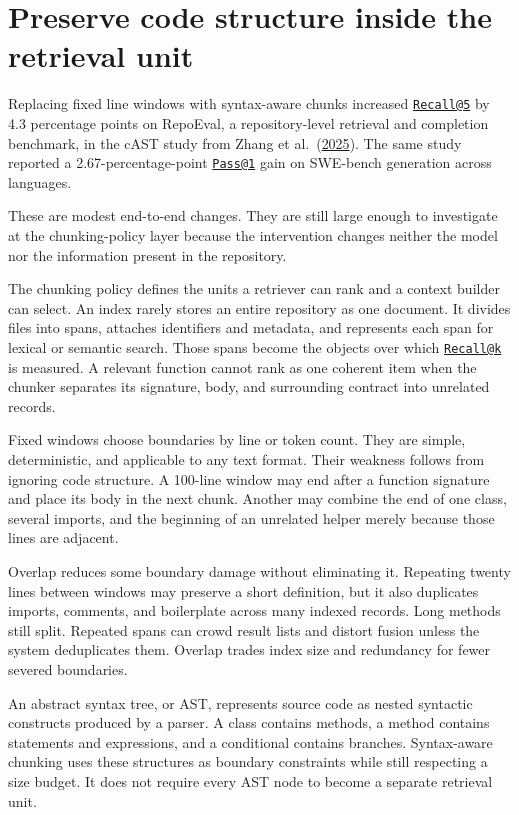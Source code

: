 \section{Preserve code structure inside the retrieval unit}\label{preserve-code-structure-inside-the-retrieval-unit}

Replacing fixed line windows with syntax-aware chunks increased \href{mailto:Recall@5}{\nolinkurl{Recall@5}} by 4.3 percentage points on RepoEval, a repository-level retrieval and completion benchmark, in the cAST study from Zhang et al.~(\href{https://arxiv.org/abs/2506.15655}{2025}). The same study reported a 2.67-percentage-point \href{mailto:Pass@1}{\nolinkurl{Pass@1}} gain on SWE-bench generation across languages.

These are modest end-to-end changes. They are still large enough to investigate at the chunking-policy layer because the intervention changes neither the model nor the information present in the repository.

The chunking policy defines the units a retriever can rank and a context builder can select. An index rarely stores an entire repository as one document. It divides files into spans, attaches identifiers and metadata, and represents each span for lexical or semantic search. Those spans become the objects over which \href{mailto:Recall@k}{\nolinkurl{Recall@k}} is measured. A relevant function cannot rank as one coherent item when the chunker separates its signature, body, and surrounding contract into unrelated records.

Fixed windows choose boundaries by line or token count. They are simple, deterministic, and applicable to any text format. Their weakness follows from ignoring code structure. A 100-line window may end after a function signature and place its body in the next chunk. Another may combine the end of one class, several imports, and the beginning of an unrelated helper merely because those lines are adjacent.

Overlap reduces some boundary damage without eliminating it. Repeating twenty lines between windows may preserve a short definition, but it also duplicates imports, comments, and boilerplate across many indexed records. Long methods still split. Repeated spans can crowd result lists and distort fusion unless the system deduplicates them. Overlap trades index size and redundancy for fewer severed boundaries.

An abstract syntax tree, or AST, represents source code as nested syntactic constructs produced by a parser. A class contains methods, a method contains statements and expressions, and a conditional contains branches. Syntax-aware chunking uses these structures as boundary constraints while still respecting a size budget. It does not require every AST node to become a separate retrieval unit.

